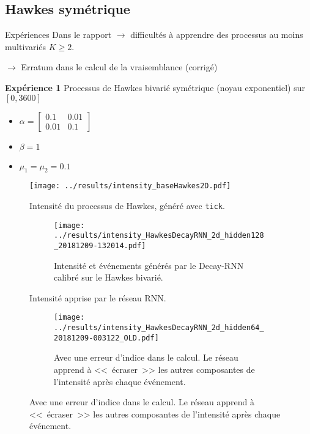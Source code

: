 \documentclass{beamer}
\begin{document}
\subsection{Hawkes symétrique}

\begin{frame}{Expériences}
Dans le rapport $\rightarrow$ difficultés à apprendre des processus au moins multivariés $K\geq 2$.\pause

$\rightarrow$ Erratum dans le calcul de la vraisemblance (corrigé)

\textbf{Expérience 1} Processus de Hawkes bivarié symétrique (noyau exponentiel) sur $[0, 3600]$
\begin{itemize}
	\item $\alpha = \begin{bmatrix}0.1 & 0.01 \\ 0.01 & 0.1\end{bmatrix}$
	\item $\beta = 1$
	\item $\mu_1 = \mu_2 = \num{0.1}$
\end{itemize}
\end{frame}

\begin{frame}

\begin{figure}
	\texttt{[image: ../results/intensity\_baseHawkes2D.pdf]}
	\caption{Intensité du processus de Hawkes, généré avec \texttt{tick}.}
\end{figure}
\end{frame}

\begin{frame}
\begin{figure}
	\begin{subfigure}{\linewidth}
		\texttt{[image: ../results/intensity\_HawkesDecayRNN\_2d\_hidden128\_20181209-132014.pdf]}
		\caption{Intensité et événements générés par le Decay-RNN calibré sur le Hawkes bivarié.}
	\end{subfigure}
	\caption{Intensité apprise par le réseau RNN.}
\end{figure}
\end{frame}

\begin{frame}
\begin{figure}\ContinuedFloat
\begin{subfigure}{\linewidth}
	\texttt{[image: ../results/intensity\_HawkesDecayRNN\_2d\_hidden64\_20181209-003122\_OLD.pdf]}
	\caption{Avec une erreur d'indice dans le calcul. Le réseau apprend à <<~écraser~>> les autres composantes de l'intensité après chaque événement.}
\end{subfigure}
\end{figure}
\end{frame}
\end{document}
